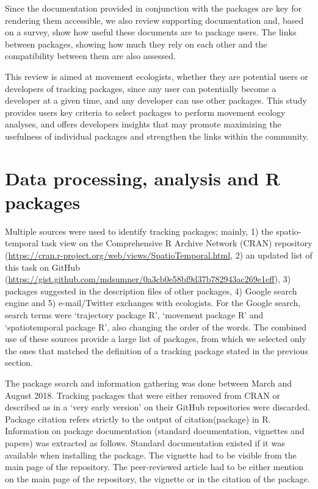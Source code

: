 \documentclass[a4paper,12pt]{article}
\begin{document}
	Since the documentation provided in conjunction with the packages are key for rendering them accessible, we also review supporting documentation and, based on a survey, show how useful these documents are to package users. The links between packages, showing how much they rely on each other and the compatibility between them are also assessed. 
	
	This review is aimed at movement ecologists, whether they are potential users or developers of tracking packages, since any user can potentially become a developer at a given time, and any developer can use other packages. This study provides users key criteria to select packages to perform movement ecology analyses, and offers developers insights that may promote maximizing the usefulness of individual packages and strengthen the links within the community. 
	
	
	
	\section*{Data processing, analysis and R packages}
	
	Multiple sources were used to identify tracking packages; mainly, 1) the spatio-temporal task view on the Comprehensive R Archive Network (CRAN) repository (\url{https://cran.r-project.org/web/views/SpatioTemporal.html}, 2) an updated list of this task on GitHub (\url{https://gist.github.com/mdsumner/0a3cb0e58bf9d37b782943ac269e1eff}), 3) packages suggested in the description files of other packages, 4) Google search engine and 5) e-mail/Twitter exchanges with ecologists. For the Google search, search terms were `trajectory package R', `movement package R' and `spatiotemporal package R', also changing the order of the words. The combined use of these sources provide a large list of packages, from which we selected only the ones that matched the definition of a tracking package stated in the previous section.
	
	The package search and information gathering was done between March and August 2018. Tracking packages that were either removed from CRAN or described as in a `very early version' on their GitHub repositories were discarded. Package citation refers strictly to the output of citation(package) in R. Information on package documentation (standard documentation, vignettes and papers) was extracted as follows. Standard documentation existed if it was available when installing the package. The vignette had to be visible from the main page of the repository. The peer-reviewed article had to be either mention on the main page of the repository, the vignette or in the citation of the package. 
	
\end{document}
